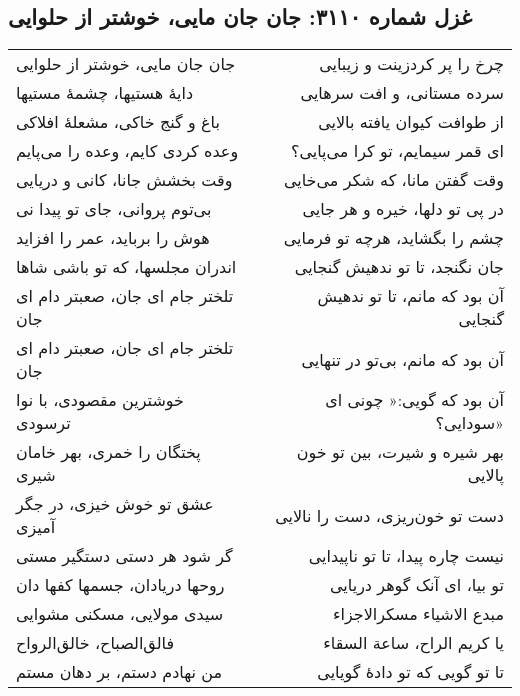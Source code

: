 \begin{center}
\section*{غزل شماره ۳۱۱۰: جان جان مایی، خوشتر از حلوایی}
\label{sec:3110}
\begin{longtable}{l p{0.5cm} r}
جان جان مایی، خوشتر از حلوایی
&&
چرخ را پر کردزینت و زیبایی
\\
دایهٔ هستیها، چشمهٔ مستیها
&&
سرده مستانی، و افت سرهایی
\\
باغ و گنج خاکی، مشعلهٔ افلاکی
&&
از طوافت کیوان یافته بالایی
\\
وعده کردی کایم، وعده را می‌پایم
&&
ای قمر سیمایم، تو کرا می‌پایی؟
\\
وقت بخشش جانا، کانی و دریایی
&&
وقت گفتن مانا، که شکر می‌خایی
\\
بی‌توم پروانی، جای تو پیدا نی
&&
در پی تو دلها، خیره و هر جایی
\\
هوش را برباید، عمر را افزاید
&&
چشم را بگشاید، هرچه تو فرمایی
\\
اندران مجلسها، که تو باشی شاها
&&
جان نگنجد، تا تو ندهیش گنجایی
\\
تلختر جام ای جان، صعبتر دام ای جان
&&
آن بود که مانم، تا تو ندهیش گنجایی
\\
تلختر جام ای جان، صعبتر دام ای جان
&&
آن بود که مانم، بی‌تو در تنهایی
\\
خوشترین مقصودی، با نوا ترسودی
&&
آن بود که گویی:« چونی ای سودایی؟»
\\
پختگان را خمری، بهر خامان شیری
&&
بهر شیره و شیرت، بین تو خون پالایی
\\
عشق تو خوش خیزی، در جگر آمیزی
&&
دست تو خون‌ریزی، دست را نالایی
\\
گر شود هر دستی دستگیر مستی
&&
نیست چاره پیدا، تا تو ناپیدایی
\\
روحها دریادان، جسمها کفها دان
&&
تو بیا، ای آنک گوهر دریایی
\\
سیدی مولایی، مسکنی مشوایی
&&
مبدع الاشیاء مسکرالاجزاء
\\
فالق‌الصباح، خالق‌الرواح
&&
یا کریم الراح، ساعة السقاء
\\
من نهادم دستم، بر دهان مستم
&&
تا تو گویی که تو دادهٔ گویایی
\\
\end{longtable}
\end{center}
